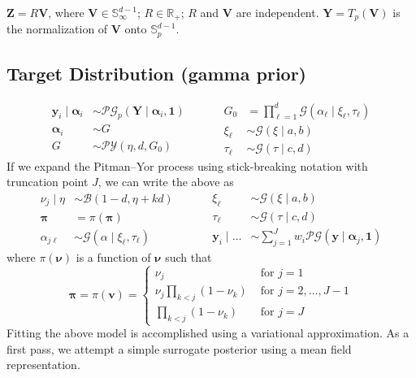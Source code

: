 $\bm{Z} = R\bm{V}$, where $\bm{V} \in \mathbb{S}_{\infty}^{d-1}$; 
$R \in \mathbb{R}_+$; $R$ and $\bm{V}$ are independent.  
$\bm{Y} = T_p(\bm{V})$ is the normalization of $\bm{V}$ onto 
$\mathbb{S}_p^{d-1}$.

\subsection{Target Distribution (gamma prior)}
\begin{equation}
    \begin{aligned}
        \bm{y}_i \mid \bm{\alpha}_i &\sim
        \mathcal{PG}_p\left(\bm{Y}\mid\bm{\alpha}_i,\bm{1}\right)\\
        \bm{\alpha}_i &\sim G\\
        G &\sim \mathcal{PY}\left(\eta, d, G_0\right)        
    \end{aligned}
    ~\hspace{1cm}
    \begin{aligned}
        G_0 &= {\textstyle\prod}_{\ell = 1}^{d}\mathcal{G}(\alpha_{\ell}\mid \xi_{\ell},\tau_{\ell})\\
        \xi_{\ell} &\sim \mathcal{G}(\xi\mid a, b)\\
        \tau_{\ell} &\sim \mathcal{G}(\tau\mid c, d)
    \end{aligned} 
\end{equation}
If we expand the Pitman--Yor process using stick-breaking notation with truncation point $J$, we can write the above as
\begin{equation}
    \begin{aligned}
        \nu_j\mid\eta &\sim \mathcal{B}(1 - d, \eta + kd)\\
        \bm{\pi} &= \pi(\bm{\pi})\\
        \alpha_{j\ell} &\sim \mathcal{G}(\alpha\mid\xi_{\ell},\tau_{\ell})
    \end{aligned}
    ~\hspace{1cm}
    \begin{aligned}
        \xi_{\ell} &\sim \mathcal{G}(\xi \mid a, b)\\
        \tau_{\ell} &\sim \mathcal{G}(\tau\mid c, d)\\
        \bm{y}_i \mid \ldots &\sim {\textstyle\sum}_{j = 1}^Jw_i\mathcal{PG}(\bm{y}\mid\bm{\alpha}_j, \bm{1})
    \end{aligned}   
\end{equation}
where $\pi(\bm{\nu})$ is a function of $\bm{\nu}$ such that
\begin{equation*}
    \bm{\pi} = \pi(\bm{v}) = \begin{cases}
        \nu_j &\text{ for }j = 1\\
        \nu_j{\textstyle\prod}_{k < j}(1 - \nu_k) &\text{ for }j = 2,\ldots,J-1\\
        {\textstyle\prod}_{k < j}(1 - \nu_k) &\text{ for }j = J
    \end{cases}
\end{equation*}
Fitting the above model is accomplished using a variational approximation.  As a first pass, we attempt a simple surrogate posterior using a mean field representation.

